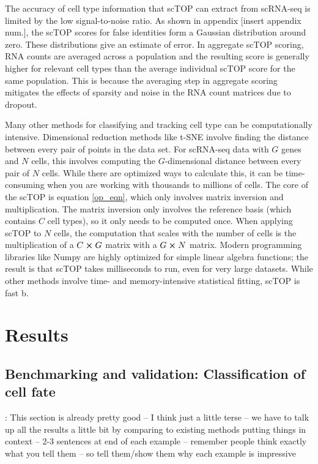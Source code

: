 \documentclass[aps,superscriptaddress, notitlepage,longbibliography]{revtex4-1}
\begin{document}
The accuracy of cell type information that scTOP can extract from scRNA-seq is limited by the low signal-to-noise ratio. As shown in appendix [insert appendix num.], the scTOP scores for false identities form a Gaussian distribution around zero. These distributions give an estimate of error. In aggregate scTOP scoring, RNA counts are averaged across a population and the resulting score is generally higher for relevant cell types than the average individual scTOP score for the same population. This is because the averaging step in aggregate scoring mitigates the effects of sparsity and noise in the RNA count matrices due to dropout.

Many other methods for classifying and tracking cell type can be computationally intensive. Dimensional reduction methods like t-SNE involve finding the distance between every pair of points in the data set. For scRNA-seq data with $G$ genes and $N$ cells, this involves computing the $G$-dimensional distance between every pair of $N$ cells. While there are optimized ways to calculate this, it can be time-consuming when you are working with thousands to millions of cells. The core of the scTOP is equation \ref{op_eqn}, which only involves matrix inversion and multiplication. The matrix inversion only involves the reference basis (which contains $C$ cell types), so it only needs to be computed once. When applying scTOP to $N$ cells, the computation that scales with the number of cells is the multiplication of a $C \cross G$ matrix with a $G \cross N$ matrix. Modern programming libraries like Numpy are highly optimized for simple linear algebra functions; the result is that scTOP takes milliseconds to run, even for very large datasets. While other methods involve time- and memory-intensive statistical fitting, scTOP is fast b.

\section{Results}

\subsection{Benchmarking and validation: Classification of cell fate}
{\color{red}: This section is already pretty good -- I think just a little terse -- we have to talk up all the results a little bit by comparing to existing methods putting things in context -- 2-3 sentences at end of each example -- remember people think exactly what you tell them -- so tell them/show them why each example is impressive}
\end{document}

